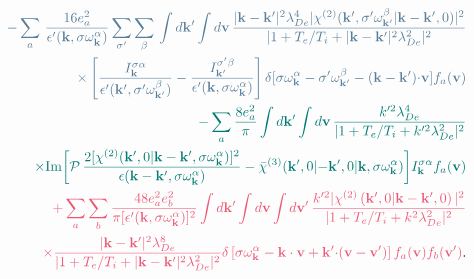 \documentclass[10pt,aspectratio=1610,lualatex]{beamer}
\begin{document}
\begin{frame}[noframenumbering]
  \begin{eqnarray*}
       &&\textcolor{darkblue}{
       -\sum_a \,\frac{16 e_a^2}{\epsilon '({\bf k},\sigma\omega_{\bf k}^\alpha)}
       \sum_{\sigma '}\sum_\beta\,
    \int d{\bf k'}\int d{\bf v}\,
       \frac{|{\bf k-k'}|^2 \lambda_{De}^4
       |\chi^{(2)}({\bf k'},\sigma '\omega_{\bf k'}^\beta|{\bf k-k'},0)|^2}
    {|1+T_e/T_i+|{\bf k-k'}|^2 \lambda_{De}^2|^2}}
    \nonumber\\
    &&\textcolor{darkblue}{\times \left[ \frac{I_{\bf k}^{\sigma \alpha}}
      {\epsilon '({\bf k'},\sigma '\omega_{\bf k'}^\beta)}
      -\frac{I_{\bf k'}^{\sigma '\beta}}
	{\epsilon '({\bf k},\sigma \omega_{\bf k}^\alpha)}\right] 
    \delta[\sigma\omega_{\bf k}^\alpha-\sigma '\omega_{\bf k'}^\beta
    -({\bf k-k'}){\bf \cdot v}]f_a({\bf v})}
	 \nonumber\\
      &&\textcolor{skobeloff}{-\sum_a \frac{8 e_a^2}{\pi}
	 \int d{\bf k '}\int d{\bf v}\,
	 \frac{k'^2\lambda_{De}^4}{|1+T_e/T_i+k'^2\lambda_{De}^2|^2}}
	 \nonumber\\
    &&\textcolor{skobeloff}{
     \times\mbox{Im}\biggl[ \mathcal{P}\,
    \frac{2[\chi^{(2)}({\bf k'},0|{\bf k-k'},\sigma\omega_{\bf k}^\alpha)]^2}
    {\epsilon({\bf k-k'},\sigma \omega_{\bf k}^\alpha)}
       -\bar \chi^{(3)}({\bf k'},0|{\bf -k'},0|{\bf k},\sigma\omega_{\bf k}^\alpha)\biggr]
       I_{\bf k}^{\sigma \alpha}f_a({\bf v})}
      \nonumber\\
 &&\textcolor{softred}{+\sum_a\sum_b
     \frac{48 e_a^2 e_b^2}{\pi[\epsilon '({\bf k},\sigma\omega_{\bf k}^\alpha)]^2}
     \int d{\bf k '} \int d{\bf v} \int d{\bf v'}\,
     \frac{k'^2|\chi^{(2)} \left( {\bf k'},0|{\bf k-k'},0 \right)|^2}
     {|1+T_e/T_i+k^2 \lambda_{De}^2|^2}}
    \nonumber\\
  &&\textcolor{softred}{\times \frac{|{\bf k-k'}|^2\lambda_{De}^8}
     {|1+T_e/T_i+|{\bf k-k'}|^2 \lambda_{De}^2|^2} 
     \delta \left[ \sigma\omega_{\bf k}^\alpha-{\bf k \cdot v}
	+{\bf k' \cdot}({\bf v-v'})\right] f_a({\bf v}) f_b({\bf v'})}.
       \label{wave-gen}
\end{eqnarray*}
\end{frame}
\end{document}
